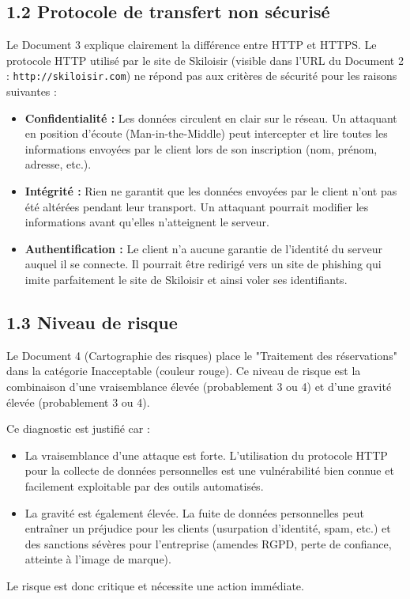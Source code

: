 \documentclass[12pt,a4paper]{article}
\begin{document}
\subsection*{1.2 Protocole de transfert non sécurisé}
Le Document 3 explique clairement la différence entre HTTP et HTTPS. Le protocole HTTP utilisé par le site de Skiloisir (visible dans l'URL du Document 2 : \texttt{http://skiloisir.com}) ne répond pas aux critères de sécurité pour les raisons suivantes :
\begin{itemize}
    	\item \textbf{Confidentialité :} Les données circulent en clair sur le réseau. Un attaquant en position d'écoute (Man-in-the-Middle) peut intercepter et lire toutes les informations envoyées par le client lors de son inscription (nom, prénom, adresse, etc.).
    	\item \textbf{Intégrité :} Rien ne garantit que les données envoyées par le client n'ont pas été altérées pendant leur transport. Un attaquant pourrait modifier les informations avant qu'elles n'atteignent le serveur.
    	\item \textbf{Authentification :} Le client n'a aucune garantie de l'identité du serveur auquel il se connecte. Il pourrait être redirigé vers un site de phishing qui imite parfaitement le site de Skiloisir et ainsi voler ses identifiants.
\end{itemize}
\clearpage
\subsection*{1.3 Niveau de risque}
Le Document 4 (Cartographie des risques) place le "Traitement des réservations" dans la catégorie Inacceptable (couleur rouge). Ce niveau de risque est la combinaison d'une vraisemblance élevée (probablement 3 ou 4) et d'une gravité élevée (probablement 3 ou 4).

Ce diagnostic est justifié car :
\begin{itemize}
    	\item La vraisemblance d'une attaque est forte. L'utilisation du protocole HTTP pour la collecte de données personnelles est une vulnérabilité bien connue et facilement exploitable par des outils automatisés.
    	\item La gravité est également élevée. La fuite de données personnelles peut entraîner un préjudice pour les clients (usurpation d'identité, spam, etc.) et des sanctions sévères pour l'entreprise (amendes RGPD, perte de confiance, atteinte à l'image de marque).
\end{itemize}
Le risque est donc critique et nécessite une action immédiate.
\end{document}
